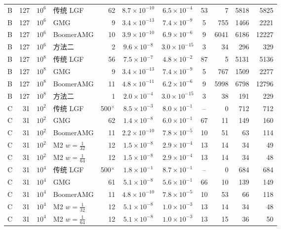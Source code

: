 \begin{longtable}{lrrlrcccrrr}
B & 127 & $10^{6}$ & 传统 LGF & 62 & $8.7{\times}10^{-10}$ & $6.5{\times}10^{-4}$ & 53 & 7 & 5818 & 5825 \\
B & 127 & $10^{6}$ & GMG & 9 & $3.4{\times}10^{-13}$ & $7.4{\times}10^{-9}$ & 5 & 755 & 1466 & 2221 \\
B & 127 & $10^{6}$ & BoomerAMG & 10 & $3.9{\times}10^{-10}$ & $6.9{\times}10^{-6}$ & 9 & 6041 & 6186 & 12227 \\
B & 127 & $10^{6}$ & 方法二 & 2 & $9.6{\times}10^{-8}$ & $3.0{\times}10^{-15}$ & 3 & 34 & 296 & 329 \\
B & 127 & $10^{8}$ & 传统 LGF & 56 & $7.5{\times}10^{-7}$ & $4.8{\times}10^{-2}$ & 87 & 5 & 5131 & 5136 \\
B & 127 & $10^{8}$ & GMG & 9 & $3.4{\times}10^{-13}$ & $7.4{\times}10^{-9}$ & 5 & 767 & 1509 & 2277 \\
B & 127 & $10^{8}$ & BoomerAMG & 11 & $4.8{\times}10^{-11}$ & $6.2{\times}10^{-6}$ & 9 & 5998 & 6798 & 12796 \\
B & 127 & $10^{8}$ & 方法二 & 1 & $2.0{\times}10^{-4}$ & $3.0{\times}10^{-15}$ & 3 & 38 & 191 & 229 \\
C & 31 & $10^{2}$ & 传统 LGF & 500$^\times$ & $8.5{\times}10^{-3}$ & $8.0{\times}10^{-1}$ & -- & 0 & 712 & 712 \\
C & 31 & $10^{2}$ & GMG & 62 & $1.4{\times}10^{-8}$ & $6.0{\times}10^{-1}$ & 67 & 11 & 149 & 160 \\
C & 31 & $10^{2}$ & BoomerAMG & 11 & $2.2{\times}10^{-10}$ & $7.8{\times}10^{-5}$ & 10 & 51 & 63 & 114 \\
C & 31 & $10^{2}$ & M2 $w{=}\frac1{32}$ & 12 & $1.5{\times}10^{-8}$ & $2.9{\times}10^{-4}$ & 13 & 14 & 34 & 49 \\
C & 31 & $10^{2}$ & M2 $w{=}\frac1{64}$ & 12 & $1.5{\times}10^{-8}$ & $2.9{\times}10^{-4}$ & 13 & 14 & 34 & 48 \\
C & 31 & $10^{4}$ & 传统 LGF & 500$^\times$ & $1.8{\times}10^{-1}$ & $8.7{\times}10^{-1}$ & -- & 0 & 684 & 684 \\
C & 31 & $10^{4}$ & GMG & 61 & $5.1{\times}10^{-8}$ & $5.6{\times}10^{-1}$ & 66 & 10 & 139 & 149 \\
C & 31 & $10^{4}$ & BoomerAMG & 11 & $4.8{\times}10^{-10}$ & $7.8{\times}10^{-5}$ & 10 & 53 & 66 & 118 \\
C & 31 & $10^{4}$ & M2 $w{=}\frac1{32}$ & 12 & $5.1{\times}10^{-8}$ & $1.0{\times}10^{-3}$ & 13 & 14 & 34 & 48 \\
C & 31 & $10^{4}$ & M2 $w{=}\frac1{64}$ & 12 & $5.1{\times}10^{-8}$ & $1.0{\times}10^{-3}$ & 13 & 15 & 36 & 50 \\

\end{longtable}
